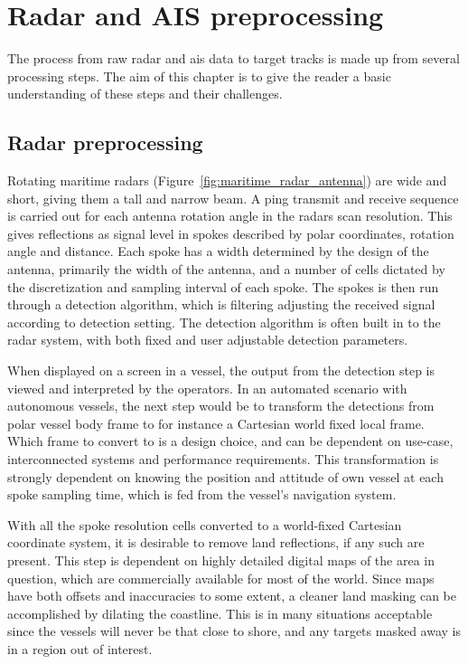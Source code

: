 
\chapter{Radar and AIS preprocessing}\label{chapter:radar-and-ais-preprocessing}
The process from raw radar and \gls{ais} data to target tracks is made up from several processing steps. The aim of this chapter is to give the reader a basic understanding of these steps and their challenges.

\section{Radar preprocessing}\label{sec:radar_preprocessing}
Rotating maritime radars (Figure~\ref{fig:maritime_radar_antenna}) are wide and short, giving them a tall and narrow beam. A ping transmit and receive sequence is carried out for each antenna rotation angle in the radars scan resolution. This gives reflections as signal level in spokes described by polar coordinates, rotation angle and distance. Each spoke has a width determined by the design of the antenna, primarily the width of the antenna, and a number of cells dictated by the discretization and sampling interval of each spoke. The spokes is then run through a detection algorithm, which is filtering adjusting the received signal according to detection setting. The detection algorithm is often built in to the radar system, with both fixed and user adjustable detection parameters.

When displayed on a screen in a vessel, the output from the detection step is viewed and interpreted by the operators. In an automated scenario with autonomous vessels, the next step would be to transform the detections from polar vessel body frame to for instance a Cartesian world fixed local frame. Which frame to convert to is a design choice, and can be dependent on use-case, interconnected systems and performance requirements. This transformation is strongly dependent on knowing the position and attitude of own vessel at each spoke sampling time, which is fed from the vessel's navigation system.

With all the spoke resolution cells converted to a world-fixed Cartesian coordinate system, it is desirable to remove land reflections, if any such are present. This step is dependent on highly detailed digital maps of the area in question, which are commercially available for most of the world. Since maps have both offsets and inaccuracies to some extent, a cleaner land masking can be accomplished by dilating the coastline. This is in many situations acceptable since the vessels will never be that close to shore, and any targets masked away is in a region out of interest.

